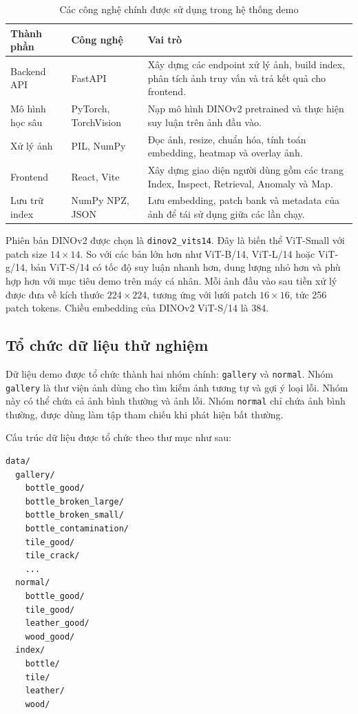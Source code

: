 \begin{table}[H]
    \centering
    \begin{tabular}{|l|l|p{7cm}|}
        \hline
        \textbf{Thành phần} & \textbf{Công nghệ} & \textbf{Vai trò} \\
        \hline
        Backend API & FastAPI & Xây dựng các endpoint xử lý ảnh, build index, phân tích ảnh truy vấn và trả kết quả cho frontend. \\
        \hline
        Mô hình học sâu & PyTorch, TorchVision & Nạp mô hình DINOv2 pretrained và thực hiện suy luận trên ảnh đầu vào. \\
        \hline
        Xử lý ảnh & PIL, NumPy & Đọc ảnh, resize, chuẩn hóa, tính toán embedding, heatmap và overlay ảnh. \\
        \hline
        Frontend & React, Vite & Xây dựng giao diện người dùng gồm các trang Index, Inspect, Retrieval, Anomaly và Map. \\
        \hline
        Lưu trữ index & NumPy NPZ, JSON & Lưu embedding, patch bank và metadata của ảnh để tái sử dụng giữa các lần chạy. \\
        \hline
    \end{tabular}
    \caption{Các công nghệ chính được sử dụng trong hệ thống demo}
\end{table}

Phiên bản DINOv2 được chọn là \texttt{dinov2\_vits14}. Đây là biến thể ViT-Small với patch size $14 \times 14$. So với các bản lớn hơn như ViT-B/14, ViT-L/14 hoặc ViT-g/14, bản ViT-S/14 có tốc độ suy luận nhanh hơn, dung lượng nhỏ hơn và phù hợp hơn với mục tiêu demo trên máy cá nhân. Mỗi ảnh đầu vào sau tiền xử lý được đưa về kích thước $224 \times 224$, tương ứng với lưới patch $16 \times 16$, tức 256 patch tokens. Chiều embedding của DINOv2 ViT-S/14 là 384.

\subsection{Tổ chức dữ liệu thử nghiệm}
Dữ liệu demo được tổ chức thành hai nhóm chính: \texttt{gallery} và \texttt{normal}. Nhóm \texttt{gallery} là thư viện ảnh dùng cho tìm kiếm ảnh tương tự và gợi ý loại lỗi. Nhóm này có thể chứa cả ảnh bình thường và ảnh lỗi. Nhóm \texttt{normal} chỉ chứa ảnh bình thường, được dùng làm tập tham chiếu khi phát hiện bất thường.

Cấu trúc dữ liệu được tổ chức theo thư mục như sau:

\begin{verbatim}
data/
  gallery/
    bottle_good/
    bottle_broken_large/
    bottle_broken_small/
    bottle_contamination/
    tile_good/
    tile_crack/
    ...
  normal/
    bottle_good/
    tile_good/
    leather_good/
    wood_good/
  index/
    bottle/
    tile/
    leather/
    wood/
\end{verbatim}

